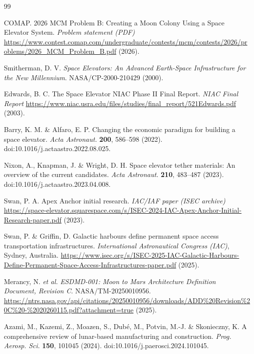 \documentclass[12pt]{article}
\begin{document}
\begin{thebibliography}{99}
	
	COMAP.
	2026 MCM Problem B: Creating a Moon Colony Using a Space Elevator System.
	\textit{Problem statement (PDF)}
	\url{https://www.contest.comap.com/undergraduate/contests/mcm/contests/2026/problems/2026_MCM_Problem_B.pdf} (2026).
	
	Smitherman, D. V.
	\textit{Space Elevators: An Advanced Earth-Space Infrastructure for the New Millennium}.
	NASA/CP-2000-210429 (2000).
	
	Edwards, B. C.
	The Space Elevator NIAC Phase II Final Report.
	\textit{NIAC Final Report}
	\url{https://www.niac.usra.edu/files/studies/final_report/521Edwards.pdf} (2003).
	
	Barry, K. M. \& Alfaro, E. P.
	Changing the economic paradigm for building a space elevator.
	\textit{Acta Astronaut.} \textbf{200}, 586--598 (2022).
	doi:10.1016/j.actaastro.2022.08.025.
	
	Nixon, A., Knapman, J. \& Wright, D. H.
	Space elevator tether materials: An overview of the current candidates.
	\textit{Acta Astronaut.} \textbf{210}, 483--487 (2023).
	doi:10.1016/j.actaastro.2023.04.008.
	
	Swan, P. A.
	Apex Anchor initial research.
	\textit{IAC/IAF paper (ISEC archive)}
	\url{https://space-elevator.squarespace.com/s/ISEC-2024-IAC-Apex-Anchor-Initial-Research-paper.pdf} (2023).
	
	Swan, P. \& Griffin, D.
	Galactic harbours define permanent space access transportation infrastructures.
	\textit{International Astronautical Congress (IAC)}, Sydney, Australia.
	\url{https://www.isec.org/s/ISEC-2025-IAC-Galactic-Harbours-Define-Permanent-Space-Access-Infrastructures-paper.pdf} (2025).
	
	Merancy, N. \textit{et al.}
	\textit{ESDMD-001: Moon to Mars Architecture Definition Document, Revision C}.
	NASA/TM-20250010956.
	\url{https://ntrs.nasa.gov/api/citations/20250010956/downloads/ADD%20Revision%20C%20-%2020260115.pdf?attachment=true} (2025).
	
	Azami, M., Kazemi, Z., Moazen, S., Dub\'e, M., Potvin, M.-J. \& Skonieczny, K.
	A comprehensive review of lunar-based manufacturing and construction.
	\textit{Prog. Aerosp. Sci.} \textbf{150}, 101045 (2024).
	doi:10.1016/j.paerosci.2024.101045.
	

\end{thebibliography}
\end{document}
